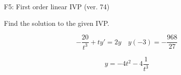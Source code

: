 \begin{exercise}
  \begin{exerciseTitle}F5: First order linear IVP (ver. 74)\end{exerciseTitle}
  \begin{exerciseStatement}
    
Find the solution to the given IVP.

    
\[-\frac{20}{t^{3}} +ty'= 2 y \hspace{1em} y( -3 ) = -\frac{968}{27}\]

  \end{exerciseStatement}
  \begin{exerciseAnswer}
    
\[y= -4 t^ 2 -4 \frac{1}{t^{3}}\]

  \end{exerciseAnswer}
\end{exercise}